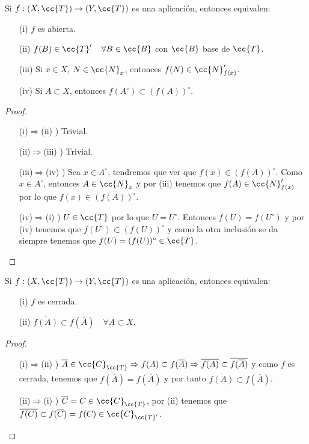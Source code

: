 \begin{prop}
    Si $f:(X, \cc{T}) \to (Y,\cc{T})$ es una aplicación, entonces equivalen:
    \begin{enumerate}
        \item[(i)] $f$ es abierta.
        \item[(ii)] $f(B)\in \cc{T}'$\ \ $\forall B \in \cc{B}$ con $\cc{B}$ base de $\cc{T}$.
        \item[(iii)] Si  $x\in X$, $N\in \cc{N}_x$, entonces $f(N)\in \cc{N}_{f(x)}'$.
        \item[(iv)] Si $A\subset X$, entonces $f(A^\circ)\subset (f(A))^\circ$.
    \end{enumerate}
    \begin{proof}\
        \begin{itemize}
            \item[(i)$\Rightarrow$(ii) )] Trivial.
            \item[(ii)$\Rightarrow$(iii) )] Trivial.
            \item[(iii)$\Rightarrow$(iv) )] Sea $x\in A^\circ$, tendremos que ver que $f(x)\in (f(A))^\circ$. Como $x\in A^\circ$, entonces $A\in \cc{N}_x$ y por (iii) tenemos que $f(A)\in \cc{N}_{f(x)}'$ por lo que $f(x)\in (f(A))^\circ$.
            \item[(iv)$\Rightarrow$(i) )] $U\in \cc{T}$ por lo que $U=U^\circ$. Entonces $f(U) = f(U^\circ)$ y por (iv) tenemos que $f(U^\circ)\subset (f(U))^\circ$  y como la otra inclusión se da siempre tenemos que $f(U)=(f(U))^\circ\in \cc{T}$.
        \end{itemize}
    \end{proof}
\end{prop}

\begin{prop}
    Si $f:(X, \cc{T}) \to (Y,\cc{T})$ es una aplicación, entonces equivalen:
    \begin{enumerate}
        \item[(i)] $f$ es cerrada.
        \item[(ii)] $\overline{f(A)}\subset f(\overline{A})$\ \ $\forall A \subset X$.
    \end{enumerate}
    \begin{proof}\
        \begin{itemize}
            \item[(i)$\Rightarrow$(ii) )] $\overline{A}\in \cc{C}_{\cc{T}} \Rightarrow f(A)\subset f(\overline{A}) \Rightarrow \overline{f(A)}\subset \overline{f(\overline{A})}$ y como $f$ es cerrada, tenemos que $\overline{f(\overline{A})} = f(\overline{A})$ y por tanto $\overline{f(A)}\subset f(\overline{A})$.
            

            \item[(ii)$\Rightarrow$(i) )] $\overline{C}=C\in \cc{C}_{\cc{T}}$, por (ii) tenemos que $\overline{f(C)}\subset f(\overline{C})= f(C) \in \cc{C}_{\cc{T}'}$. 
        \end{itemize}
    \end{proof}
\end{prop}

